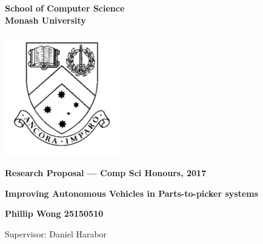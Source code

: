 \documentclass[a4paper,11pt]{article}
\begin{document}
\thispagestyle{empty} %
\renewcommand{\thepage}{\roman{page}}

\begin{spacing}{1.5}
\begin{center}
{\Large \bfseries
School of Computer Science \\
Monash University}

\vspace*{30mm}

\includegraphics[width=5cm]{graphics/MonashCrest.pdf}

\vspace*{15mm}

{\large \bfseries
Research Proposal --- Comp Sci Honours, 2017
}

\vspace*{10mm}

{\LARGE \bfseries
Improving Autonomous Vehicles in Parts-to-picker systems
}

\vspace*{20mm}

{\large \bfseries
Phillip Wong 25150510

\vspace*{20mm}


Supervisor: Daniel Harabor
}

\end{center}
\end{spacing}

\newpage

\tableofcontents

\newpage
\setcounter{page}{1}
\renewcommand{\thepage}{\arabic{page}}

	\begin{abstract} %
	\noindent \textbf The order picking process is the number one expense in warehouse systems. Here we look at parts-to-picker a type of order picking where the products are autonomously retrieved and given to the pickers. Previous research have focused on improvements in the multi-agent path finding but they often overlook simple adjustments or additions which may reduce complexity of the problem.  This project will test the effect that these aspects have on improving order-picking. We will create a simulation and focus on the warehouse layout first. The results of this project will help identify how small adjustments may increase the efficiency of the order picking process.
	
\end{abstract}
\end{document}
